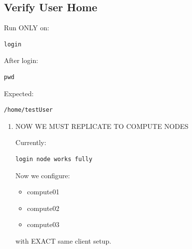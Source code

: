 \documentclass[11pt]{article}
\begin{document}
\subsection{Verify User Home}
\label{sec:org6d094eb}

Run ONLY on:

\begin{verbatim}
login
\end{verbatim}

After login:

\begin{verbatim}
pwd
\end{verbatim}

Expected:

\begin{verbatim}
/home/testUser
\end{verbatim}
\begin{enumerate}
\item NOW WE MUST REPLICATE TO COMPUTE NODES
\label{sec:orgf72aa5e}

Currently:

\begin{verbatim}
login node works fully
\end{verbatim}

Now we configure:

\begin{itemize}
\item compute01
\item compute02
\item compute03
\end{itemize}

with EXACT same client setup.
\end{enumerate}
\end{document}
